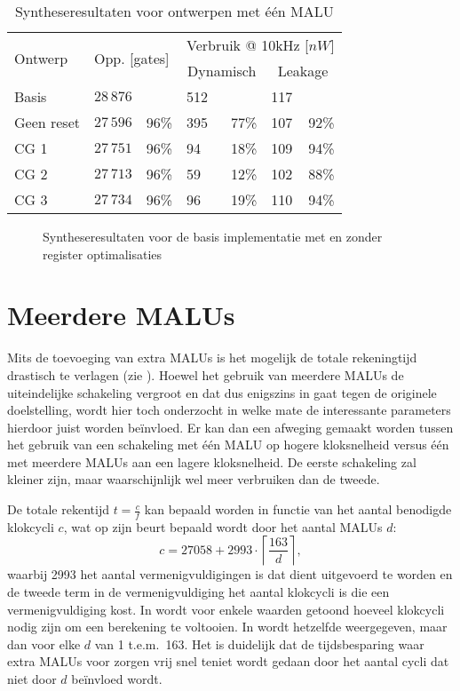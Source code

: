 \begin{table}[h]
	\caption{Syntheseresultaten voor ontwerpen met \'e\'en MALU}
	\label{tabel-resultaten-optimalisaties}

	\centering
	\begin{tabular}{llrlrlr}
		\toprule
		\multirow{2}{*}{Ontwerp}	& \multicolumn{2}{l}{\multirow{2}{*}{Opp. [gates]}}	& \multicolumn{4}{c}{Verbruik @ 10kHz [$nW$]}\\
		\cmidrule{4-7}
		&	& & \multicolumn{2}{c}{Dynamisch}	& \multicolumn{2}{c}{Leakage}\\
		\midrule
		Basis			& $28\,876$	& 			& 512	&	 		& 117 & \\
		Geen reset	& $27\,596$	& 96\%	& 395	& 77\%	& 107 & 92\%\\
		CG 1			& $27\,751$	& 96\%	& 94	& 18\%	& 109	& 94\%\\
		CG 2			& $27\,713$	& 96\%	& 59	& 12\%	& 102	& 88\%\\
		CG 3			& $27\,734$	& 96\%	& 96	& 19\%	& 110	& 94\%\\
		\bottomrule		
	\end{tabular}
\end{table}

\begin{figure}[h]
	\centering
		\caption{Syntheseresultaten voor de basis implementatie met en zonder register optimalisaties\label{figuur-resultaten-m1}}
\end{figure}

\section{Meerdere MALUs\label{sectie-resulaten-malus}}

Mits de toevoeging van extra MALUs is het mogelijk de totale rekeningtijd drastisch te verlagen (zie ). Hoewel het gebruik van meerdere MALUs de uiteindelijke schakeling vergroot en dat dus enigszins in gaat tegen de originele doelstelling, wordt hier toch onderzocht in welke mate de interessante parameters hierdoor juist worden be\"invloed. Er kan dan een afweging gemaakt worden tussen het gebruik van een schakeling met \'e\'en MALU op hogere kloksnelheid versus \'e\'en met meerdere MALUs aan een lagere kloksnelheid. De eerste schakeling zal kleiner zijn, maar waarschijnlijk wel meer verbruiken dan de tweede.

De totale rekentijd $t = \frac{c}{f}$ kan bepaald worden in functie van het aantal benodigde klokcycli $c$, wat op zijn beurt bepaald wordt door het aantal MALUs $d$:
\[c = 27058 + 2993 \cdot \left\lceil \frac{163}{d} \right\rceil,\]
waarbij 2993 het aantal vermenigvuldigingen is dat dient uitgevoerd te worden en de tweede term in de vermenigvuldiging het aantal klokcycli is die een vermenigvuldiging kost. In  wordt voor enkele waarden getoond hoeveel klokcycli nodig zijn om een berekening te voltooien. In  wordt hetzelfde weergegeven, maar dan voor elke $d$ van 1 t.e.m.\ 163. Het is duidelijk dat de tijdsbesparing waar extra MALUs voor zorgen vrij snel teniet wordt gedaan door het aantal cycli dat niet door $d$ be\"invloed wordt.


